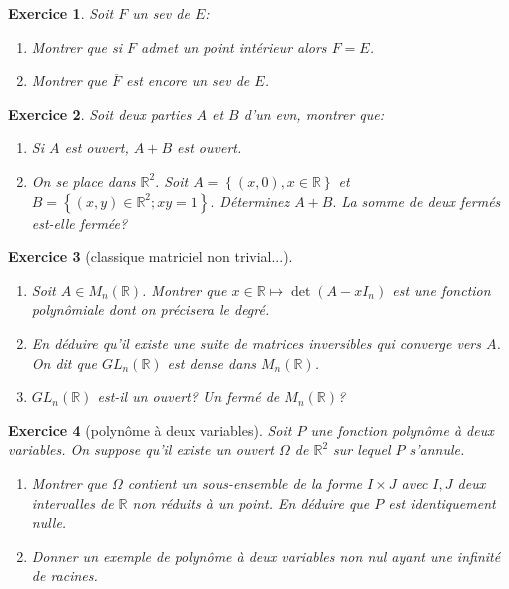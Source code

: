 \documentclass[12pt,a4paper]{article}
\newcommand{\R}{\mathbb{R}}
\theoremstyle{break}
\theoremstyle{break}
\newtheorem{Exo}{Exercice}
\begin{document}
 \begin{Exo}Soit $F$ un sev de $E$:
 	\begin{enumerate}
 		\item
 		Montrer que si $F$ admet un point intérieur alors $F=E$.
 		\item
 		Montrer que  $\overline{F}$ est encore un sev de $E$.
 	\end{enumerate}
 \end{Exo}

	
\begin{Exo}
	 	Soit deux parties $A$ et $B$ d'un evn, montrer que:
	
	\begin{enumerate}
		\item Si $A$ est ouvert, $A+B$ est ouvert.
		
		\item On se place dans $\mathbb{R}^{2}.$ Soit $A=\left\{ \left( x,0\right)
		,x\in \mathbb{R}\right\} $ et $B=\left\{ \left( x,y\right) \in \mathbb{R}%
		^{2};xy=1\right\} .$ D\'{e}terminez $A+B.$ La somme de deux ferm\'{e}s
		est-elle ferm\'{e}e?
	\end{enumerate}
\end{Exo}
	
	 
\begin{Exo}[classique matriciel non trivial...]\ 
		\begin{enumerate}
		\item
		Soit $A\in M_n(\R)$. Montrer que $x\in\R\mapsto \det(A-xI_n)$ est une fonction polynômiale dont on précisera le degré.
		\item
		En déduire qu'il existe une suite de matrices inversibles qui converge vers $A$. On dit que $GL_n(\R)$ est dense dans $M_n(\R)$.
		\item
		$GL_n(\R)$ est-il un ouvert? Un fermé de $M_n(\R)$?
	\end{enumerate}
\end{Exo}


\begin{Exo}[polynôme à deux variables]
	Soit $P$ une fonction polynôme à deux variables. On suppose qu'il existe un ouvert $\Omega$ de $\R^2$ sur lequel $P$ s'annule.
	\begin{enumerate}
		\item
		Montrer que $\Omega$ contient un sous-ensemble de la forme $I\times J$ avec $I,J$ deux intervalles de $\R$ non réduits à un point.	En déduire que $P$ est identiquement nulle.
		\item
		Donner un exemple de polynôme à deux variables non nul ayant une infinité de racines.
	\end{enumerate}
\end{Exo}
	
\end{document}
